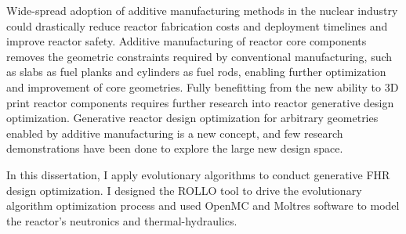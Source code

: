 
Wide-spread adoption of additive manufacturing methods in the nuclear industry 
could drastically reduce reactor fabrication costs and deployment timelines 
and improve reactor safety. 
Additive manufacturing of reactor core components removes the geometric constraints
required by conventional manufacturing, such as slabs as fuel planks and cylinders 
as fuel rods, enabling further optimization and improvement of core geometries. 
Fully benefitting from the new ability to 3D print reactor components requires further 
research into reactor generative design optimization. 
Generative reactor design optimization for arbitrary geometries enabled by additive 
manufacturing is a new concept, and few research demonstrations have been done to 
explore the large new design space. 

In this dissertation, I apply evolutionary algorithms to conduct generative \gls{FHR} 
design optimization. 
I designed the \gls{ROLLO} tool to drive the evolutionary algorithm optimization 
process and used OpenMC and Moltres software to model the reactor's neutronics and 
thermal-hydraulics. 


